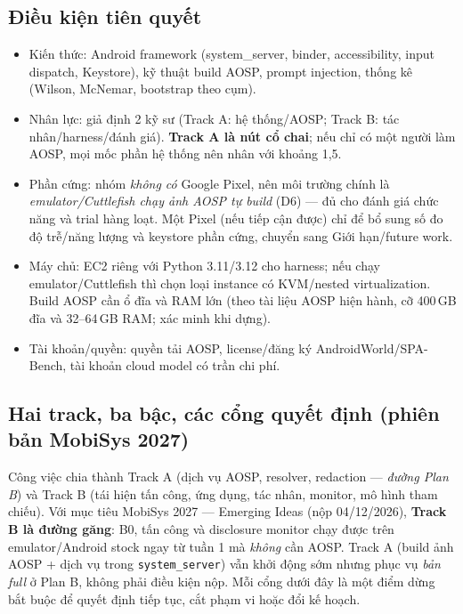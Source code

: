 \documentclass[11pt,a4paper]{article}
\newcommand{\code}[1]{\texttt{\small #1}}
\begin{document}
\subsection{Điều kiện tiên quyết}

\begin{itemize}
  \item Kiến thức: Android framework (system\_server, binder, accessibility, input dispatch, Keystore), kỹ thuật
        build AOSP, prompt injection, thống kê (Wilson, McNemar, bootstrap theo cụm).
  \item Nhân lực: giả định 2 kỹ sư (Track A: hệ thống/AOSP; Track B: tác nhân/harness/đánh giá). \textbf{Track A là nút cổ chai}; nếu chỉ có một người
        làm AOSP, mọi mốc phần hệ thống nên nhân với khoảng 1,5.
  \item Phần cứng: nhóm \emph{không có} Google Pixel, nên môi trường chính là \emph{emulator/Cuttlefish chạy ảnh AOSP tự build} (D6) --- đủ cho đánh giá chức năng và trial hàng loạt. Một Pixel (nếu tiếp cận được) chỉ để bổ sung số đo độ trễ/năng lượng và keystore phần cứng, chuyển sang Giới hạn/future work.
  \item Máy chủ: EC2 riêng với Python 3.11/3.12 cho harness; nếu chạy emulator/Cuttlefish thì chọn loại instance có KVM/nested virtualization.
        Build AOSP cần ổ đĩa và RAM lớn (theo tài liệu AOSP hiện hành, cỡ 400\,GB đĩa và 32--64\,GB RAM; xác minh khi dựng).
  \item Tài khoản/quyền: quyền tải AOSP, license/đăng ký AndroidWorld/SPA-Bench, tài khoản cloud model có trần chi phí.
\end{itemize}

\subsection{Hai track, ba bậc, các cổng quyết định (phiên bản MobiSys 2027)}
\label{sec:gatetable}

Công việc chia thành Track A (dịch vụ AOSP, resolver, redaction --- \emph{đường Plan B}) và Track B (tái hiện tấn công, ứng dụng, tác nhân, monitor, mô hình tham chiếu).
Với mục tiêu MobiSys 2027 --- Emerging Ideas (nộp 04/12/2026), \textbf{Track B là đường găng}: B0, tấn công và disclosure monitor chạy được trên emulator/Android stock ngay từ tuần 1 mà \emph{không} cần AOSP.
Track A (build ảnh AOSP + dịch vụ trong \code{system\_server}) vẫn khởi động sớm nhưng phục vụ \emph{bản full} ở Plan B, không phải điều kiện nộp.
Mỗi cổng dưới đây là một điểm dừng bắt buộc để quyết định tiếp tục, cắt phạm vi hoặc đổi kế hoạch.
\end{document}
